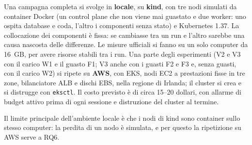 Una campagna completa si svolge in \textbf{locale}, su \textbf{kind}, con tre nodi simulati da container Docker (un control plane che non viene mai guastato e due worker: uno ospita database e coda, l'altro i componenti senza stato) e Kubernetes 1.37. La collocazione dei componenti è fissa: se cambiasse tra un run e l'altro sarebbe una causa nascosta delle differenze. Le misure ufficiali si fanno su un solo computer da 16~GB, per avere risorse stabili tra i run. Una parte degli esperimenti (V2 e V3 con il carico W1 e il guasto F1; V3 anche con i guasti F2 e F3 e, senza guasti, con il carico W2) si ripete su \textbf{AWS}, con EKS, nodi EC2 a prestazioni fisse in tre zone, bilanciatore ALB e dischi EBS, nella regione di Irlanda; il cluster si crea e si distrugge con \texttt{eksctl}. Il costo previsto è di circa 15--20 dollari, con allarme di budget attivo prima di ogni sessione e distruzione del cluster al termine.

Il limite principale dell'ambiente locale è che i nodi di kind sono container sullo stesso computer: la perdita di un nodo è simulata, e per questo la ripetizione su AWS serve a RQ6.
